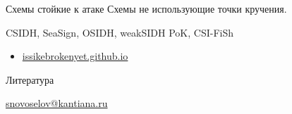 \documentclass{beamer}
\begin{document}
\begin{frame}{Схемы стойкие к атаке}
	Схемы не использующие точки кручения.
	\vspace*{1em}
	
	CSIDH, SeaSign, OSIDH, weakSIDH PoK, CSI-FiSh
	\vspace*{1em}
	\begin{itemize}
		\item \href{https://issikebrokenyet.github.io/}{issikebrokenyet.github.io}
	\end{itemize}
\end{frame}

\begin{frame}{Литература}
	\nocite{SIKE}
    \nocite{CastryckDecru2022}
	\printbibliography

    \begin{center}
        \begin{tcolorbox}[enhanced,hbox,colback=block-green-color-bg,colframe=subsection-color!120,title=Контакты,center title]
            \begin{varwidth}{\textwidth}
                \begin{center}
                    \href{mailto:snovoselov@kantiana.ru}{snovoselov@kantiana.ru}
                \end{center}
            \end{varwidth}
        \end{tcolorbox}
    \end{center}\end{frame}
\end{document}
